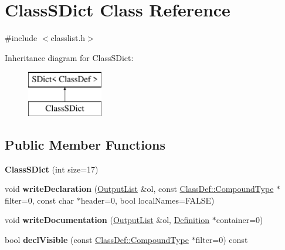 \hypertarget{class_class_s_dict}{}\section{Class\+S\+Dict Class Reference}
\label{class_class_s_dict}


{\ttfamily \#include $<$classlist.\+h$>$}

Inheritance diagram for Class\+S\+Dict\+:\begin{figure}[H]
\begin{center}
\leavevmode
\includegraphics[height=2.000000cm]{class_class_s_dict}
\end{center}
\end{figure}
\subsection*{Public Member Functions}
\begin{DoxyCompactItemize}
\item 
\mbox{\label{class_class_s_dict_a436662c1f14f86697c092287cefd4d63}} 
{\bfseries Class\+S\+Dict} (int size=17)
\item 
\mbox{\label{class_class_s_dict_afbee846a1b92da926114fa89193da408}} 
void {\bfseries write\+Declaration} (\mbox{\hyperlink{class_output_list}{Output\+List}} \&ol, const \mbox{\hyperlink{class_class_def_ae70cf86d35fe954a94c566fbcfc87939}{Class\+Def\+::\+Compound\+Type}} $\ast$filter=0, const char $\ast$header=0, bool local\+Names=F\+A\+L\+SE)
\item 
\mbox{\label{class_class_s_dict_ac05ee6f98ce67d0337337dec0d8cf477}} 
void {\bfseries write\+Documentation} (\mbox{\hyperlink{class_output_list}{Output\+List}} \&ol, \mbox{\hyperlink{class_definition}{Definition}} $\ast$container=0)
\item 
\mbox{\label{class_class_s_dict_a276081f60d4684da7a829905446c5370}} 
bool {\bfseries decl\+Visible} (const \mbox{\hyperlink{class_class_def_ae70cf86d35fe954a94c566fbcfc87939}{Class\+Def\+::\+Compound\+Type}} $\ast$filter=0) const
\end{DoxyCompactItemize}


